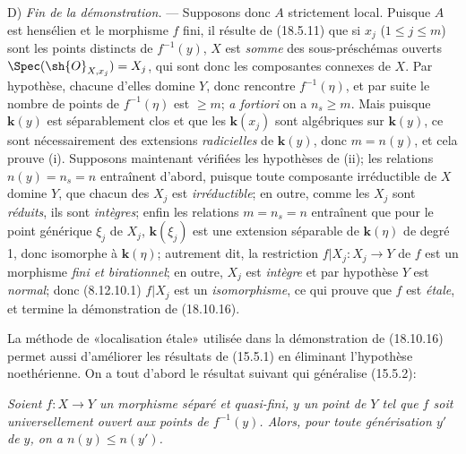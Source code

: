 D) \emph{Fin de la démonstration.} --- Supposons donc $A$ strictement local. Puisque $A$ est hensélien et le morphisme $f$ fini, il résulte de (18.5.11) que si $x_j$ ($1\leq j\leq m$) sont les points distincts de $f^{-1}(y)$, $X$ est \emph{somme} des sous-préschémas ouverts $\Spec(\sh{O}_{X,x_j})=X_j$, qui sont donc les composantes connexes de $X$. Par hypothèse, chacune d'elles domine $Y$, donc rencontre $f^{-1}(\eta)$, et par suite le nombre de points de $f^{-1}(\eta)$ est $\geq m$; \emph{a fortiori} on a $n_s\geq m$. Mais puisque $\boldsymbol{k}(y)$ est séparablement clos et que les $\boldsymbol{k}(x_j)$ sont algébriques sur $\boldsymbol{k}(y)$, ce sont nécessairement des extensions \emph{radicielles} de $\boldsymbol{k}(y)$, donc $m=n(y)$, et cela prouve (i). Supposons maintenant vérifiées les hypothèses de (ii); les relations $n(y)=n_s=n$ entraînent d'abord, puisque toute composante irréductible de $X$ domine $Y$, que chacun des $X_j$ est \emph{irréductible}; en outre, comme les $X_j$ sont \emph{réduits}, ils sont \emph{intègres}; enfin les relations $m=n_s=n$ entraînent que pour le point générique $\xi_j$ de $X_j$, $\boldsymbol{k}(\xi_j)$ est une extension séparable de $\boldsymbol{k}(\eta)$ de degré 1, donc isomorphe à $\boldsymbol{k}(\eta)$; autrement dit, la restriction $f|X_j:X_j\to Y$ de $f$ est un morphisme \emph{fini et birationnel}; en outre, $X_j$ est \emph{intègre} et par hypothèse $Y$ est \emph{normal}; donc (8.12.10.1) $f|X_j$ est un \emph{isomorphisme}, ce qui prouve que $f$ est \emph{étale}, et termine la démonstration de (18.10.16).

\begin{remark}[18.10.17]
\label{IV.18.10.17}
La méthode de «localisation étale» utilisée dans la démonstration de (18.10.16) permet aussi d'améliorer les résultats de (15.5.1) en éliminant l'hypothèse noethérienne. On a tout d'abord le résultat suivant qui généralise (15.5.2):
\end{remark}

\begin{env}[18.10.17.1]
\label{IV.18.10.17.1}
\emph{Soient $f:X\to Y$ un morphisme séparé et quasi-fini, $y$ un point de $Y$ tel que $f$ soit universellement ouvert aux points de $f^{-1}(y)$. Alors, pour toute générisation $y'$ de $y$, on a $n(y)\leq n(y')$.}
\end{env}

